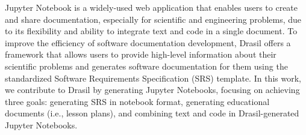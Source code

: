 
Jupyter Notebook is a widely-used web application that enables users to create 
and share documentation, especially for scientific and engineering problems, 
due to its flexibility and ability to integrate text and code in a single 
document. To improve the efficiency of software documentation development, 
Drasil offers a framework that allows users to provide high-level information 
about their scientific problems and generates software documentation for them 
using the standardized Software Requirements Specification (SRS) template. In 
this work, we contribute to Drasil by generating Jupyter Notebooks, focusing on 
achieving three goals: generating SRS in notebook format, generating 
educational documents (i.e., lesson plans), and combining text and code in 
Drasil-generated Jupyter Notebooks.
